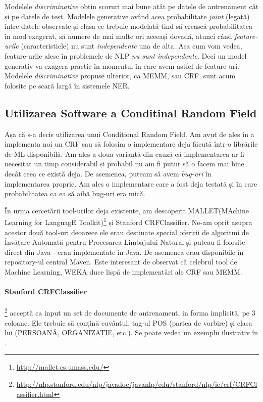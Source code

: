 Modelele \textit{discriminative} obțin scoruri mai bune atât pe datele de antrenament cât și pe datele de test. Modelele generative având acea probabilitate \textit{joint} (legată) între datele observate și clasa ce trebuie modelată tind să crească probabilitatea în mod exagerat, să numere de mai multe ori aceeași dovadă, atunci când \textit{feature-urile} (caracteristicle) nu sunt \textit{independente} una de alta. Așa cum vom vedea, feature-urile alese în problemele de NLP \textit{nu sunt independente}. Deci un model generativ va exagera practic în momentul în care avem astfel de feature-uri. Modelele \textit{discriminative} propuse ulterior, ca MEMM, sau CRF, sunt acum folosite pe scară largă în sistemele NER.

\subsection{Utilizarea Software a Conditinal Random Field}
\label{sub-sec:crf-software}

Așa că s-a decis utilizarea unui Conditional Random Field. Am avut de ales în a implementa noi un CRF sau să folosim o implementare deja făcută într-o librările de ML disponibilă. Am ales a doua variantă din cauză că implementarea ar fi necesitat un timp considerabil și probabil nu am fi putut să o facem mai bine decât ceea ce există deja. De asemenea, puteam să avem \textit{bug-uri} în implementarea proprie. Am ales o implementare care a fost deja testată și în care probabilitatea ca ea să aibă bug-uri era mică.


În urma cercetării tool-urilor deja existente, am descoperit MALLET(MAchine Learning for LanguagE Toolkit)\footnote{\url{http://mallet.cs.umass.edu/}} și Stanford CRFClassifier. Ne-am oprit asupra acestor două tool-uri deoarece ele erau destinate special oferirii de algoritmi de Învățare Automată pentru Procesarea Limbajului Natural și puteau fi folosite direct din Java - erau implementate în Java. De asemenea erau disponibile în repository-ul central Maven. Este interesant de observat că celebrul tool de Machine Learning, WEKA duce lispă de implementări ale CRF sau MEMM. 


\paragraph{Stanford CRFClassifier}\footnote{\url{http://nlp.stanford.edu/nlp/javadoc/javanlp/edu/stanford/nlp/ie/crf/CRFClassifier.html}} acceptă ca input un set de documente de antrenament, in forma implicită, pe 3 coloane. Ele trebuie să conțină cuvântul, tag-ul POS (partea de vorbire) și clasa lui (PERSOANĂ, ORGANIZAȚIE, etc.). Se poate vedea un exemplu ilustrativ în .

